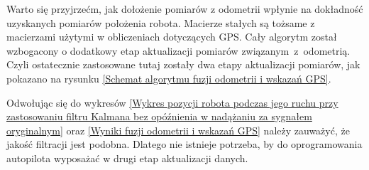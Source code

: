 {{        Warto się przyjrzećm, jak dołożenie pomiarów z odometrii wpłynie na dokładność uzyskanych pomiarów położenia robota.
        Macierze stałych są tożsame z macierzami użytymi w obliczeniach dotyczących GPS.
        Cały algorytm został wzbogacony o dodatkowy etap aktualizacji pomiarów związanym~z~odometrią. Czyli ostatecznie zastosowane tutaj zostały dwa etapy aktualizacji pomiarów, jak pokazano na rysunku \ref{Schemat algorytmu fuzji odometrii i wskazań GPS}.



        Odwołując się do wykresów \ref{Wykres pozycji robota podczas jego ruchu przy zastosowaniu filtru Kalmana bez opóźnienia w nadążaniu za sygnałem oryginalnym} oraz \ref{Wyniki fuzji odometrii i wskazań GPS} należy zauważyć, że jakość filtracji jest podobna. Dlatego nie istnieje potrzeba, by do oprogramowania autopilota wyposażać w drugi etap aktualizacji danych.
    }
}